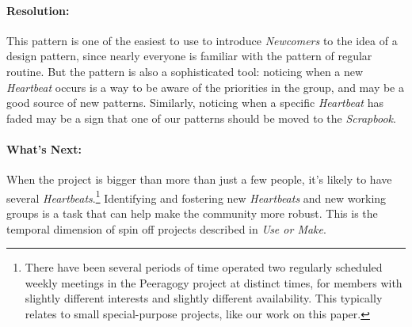 \paragraph{Resolution:} This pattern is one of the easiest to use to introduce \emph{Newcomers} to the idea of a design pattern, since nearly everyone is familiar with the pattern of regular routine.  But the pattern is also a sophisticated tool: noticing when a new \emph{Heartbeat} occurs is a way to be aware of the priorities in the group, and may be a good source of new patterns.  Similarly, noticing when a specific \emph{Heartbeat} has faded may be a sign that one of our patterns should be moved to the \emph{Scrapbook}.

\paragraph{What's Next:} When the project is bigger than more than just a few people, it's likely to have several \emph{Heartbeats}.\footnote{There have been several periods of time operated two regularly scheduled weekly meetings in the Peeragogy project at distinct times, for members with slightly different interests and slightly different availability.  This typically relates to small special-purpose projects, like our work on this paper.}  Identifying and fostering new \emph{Heartbeats} and new working groups is a task that can help make the community more robust.  This is the temporal dimension of spin off projects described in \emph{Use or Make}.

